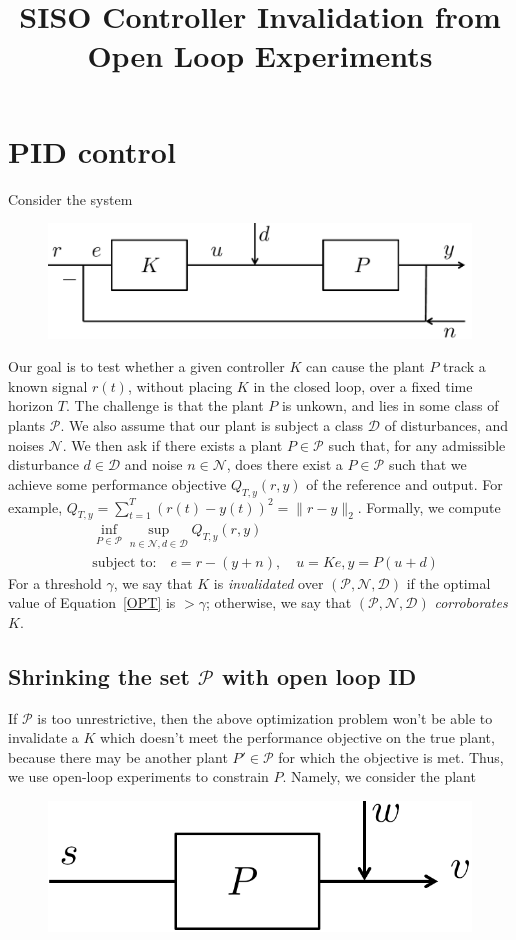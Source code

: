\documentclass[11pt]{article} %
\title{SISO Controller Invalidation from Open Loop Experiments}
\newcommand{\calD}{\mathcal{D}}
\newcommand{\calN}{\mathcal{N}}
\newcommand{\calP}{\mathcal{P}}
\theoremstyle{plain}
\theoremstyle{definition}
\theoremstyle{remark}
\begin{document}
\section{PID control}
Consider the system
\begin{figure}[h!]
  \centering
  \includegraphics[width=.5\linewidth]{sys2.pdf}
\end{figure}
Our goal is to test whether a given controller $K$ can cause the plant $P$ track a known signal $r(t)$, without placing $K$ in the closed loop, over a fixed time horizon $T$. The challenge is that the plant $P$ is unkown, and lies in some class of plants $\calP$. We also assume that our plant is subject a class $\calD$ of disturbances, and noises $\calN$. We then ask if there exists a plant $P \in \calP$ such that, for any admissible disturbance $d \in \calD$ and noise $n \in \calN$, does there exist a $P \in \calP$ such that we achieve some performance objective $Q_{T,y}(r,y)$ of the reference and output. For example, $Q_{T,y} = \sum_{t=1}^T (r(t)-y(t))^{2} = \|r - y\|_{2}$. Formally, we compute
\begin{equation}\label{OPT}
\begin{aligned}
&\inf_{P \in \calP} \sup_{n \in \calN,d \in \calD} Q_{T,y}(r,y)  \\
&\text{subject to:} \quad e = r - (y+n), \quad u = Ke, y = P(u+d)
\end{aligned}
\end{equation}
For a threshold $\gamma$, we say that $K$ is \emph{invalidated} over $(\calP,\calN,\calD)$ if the optimal value of Equation~\ref{OPT} is $> \gamma$; otherwise, we say that $(\calP,\calN,\calD)$ \emph{corroborates} $K$. 
\subsection{Shrinking the set $\calP$ with open loop ID}
If $\calP$ is too unrestrictive, then the above optimization problem won't be able to invalidate a $K$ which doesn't meet the performance objective on the true plant, because there may be another plant $P' \in \calP$ for which the objective is met. Thus, we use open-loop experiments to constrain $P$. Namely, we consider the plant

\begin{figure}[h!]
  \centering
  \includegraphics[width=.3\linewidth]{sys3.pdf}
\end{figure}
\end{document}
